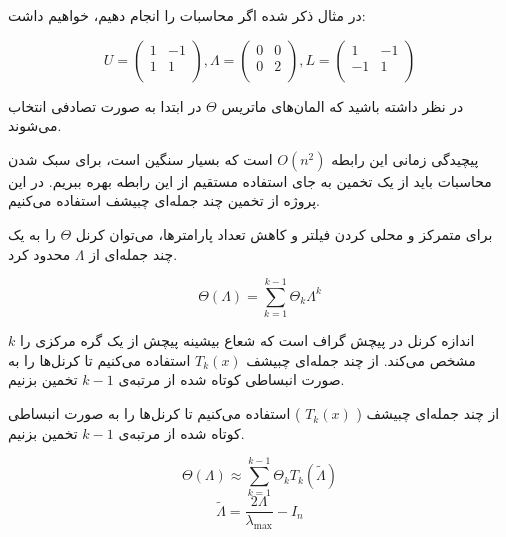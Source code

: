 در مثال ذکر شده اگر محاسبات را انجام دهیم، خواهیم داشت:

\[
U = \left(
  \begin{array}{cc}
  1 & -1 \\
  1 & 1 \\
  \end{array}
\right),
\Lambda = \left(
  \begin{array}{cc}
  0 & 0 \\
  0 & 2 \\
  \end{array}
\right),
L = \left(
  \begin{array}{cc}
  1 & -1 \\
  -1 & 1 \\
  \end{array}
\right)
\]

در نظر داشته باشید که المان‌های ماتریس $\Theta$ در ابتدا به صورت تصادفی انتخاب می‌شوند.

پیچیدگی زمانی این رابطه $O(n^{2})$ است که بسیار سنگین است، برای سبک شدن محاسبات باید از یک تخمین به جای استفاده مستقیم از این رابطه بهره ببریم.
در این پروژه از تخمین چند جمله‌ای چبیشف استفاده می‌کنیم.

برای متمرکز و محلی کردن فیلتر و کاهش تعداد پارامترها، می‌توان کرنل $\Theta$ را به یک چند جمله‌ای از $\varLambda$ محدود کرد.

\[
  \Theta(\varLambda) = \sum_{k=1}^{k-1}\Theta_{k}\varLambda^{k}
\]

$k$ اندازه کرنل در پیچش گراف است که شعاع بیشینه پیچش از یک گره مرکزی را مشخص می‌کند. از چند جمله‌ای چبیشف $T_{k}(x)$ استفاده می‌کنیم تا
کرنل‌ها را به صورت انبساطی کوتاه شده از مرتبه‌ی $k-1$ تخمین بزنیم.

 از چند جمله‌ای چبیشف
( $T_{k}(x)$ )
 استفاده می‌کنیم تا کرنل‌ها را به صورت انبساطی کوتاه شده از مرتبه‌ی
 $k-1$
 تخمین بزنیم.

\[
  \Theta(\varLambda) \approx \sum_{k=1}^{k-1}\Theta_{k}T_{k}(\widetilde{\varLambda})
\]
\[
  \widetilde{\varLambda} = \frac{2\varLambda}{\lambda_{\max}} - I_{n}
\]


